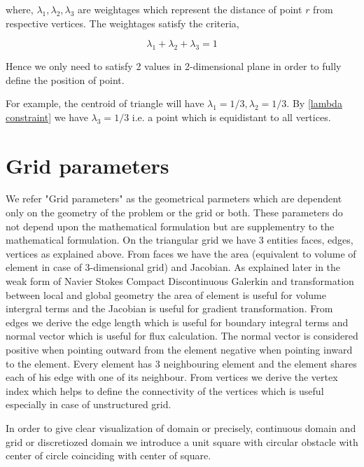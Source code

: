 \documentclass[a4paper,10pt]{book}
\begin{document}
where, $\lambda_1, \lambda_2, \lambda_3$ are weightages which represent the distance of point $r$ from respective vertices. The weightages satisfy the criteria,

\begin{equation}\label{lambda constraint}
\lambda_1 + \lambda_2 + \lambda_3 = 1
\end{equation}

Hence we only need to satisfy 2 values in 2-dimensional plane in order to fully define the position of point.

For example, the centroid of triangle will have $\lambda_1 = 1/3, \lambda_2 = 1/3$. By \eqref{lambda constraint} we have $\lambda_3=1/3$ i.e. a point which is equidistant to all vertices.

\section{Grid parameters}

We refer "Grid parameters" as the geometrical parmeters which are dependent only on the geometry of the problem or the grid or both. These parameters do not depend upon the mathematical formulation but are supplementry to the mathematical formulation. On the triangular grid we have 3 entities faces, edges, vertices as explained above. From faces we have the area (equivalent to volume of element in case of 3-dimensional grid) and Jacobian. As explained later in the weak form of Navier Stokes Compact Discontinuous Galerkin and transformation between local and global geometry the area of element is useful for volume intergral terms and the Jacobian is useful for gradient transformation. From edges we derive the edge length which is useful for boundary integral terms and normal vector which is useful for flux calculation. The normal vector is considered positive when pointing outward from the element negative when pointing inward to the element. Every element has 3 neighbouring element and the element shares each of his edge with one of its neighbour. From vertices we derive the vertex index which helps to define the connectivity of the vertices which is useful especially in case of unstructured grid. 

In order to give clear visualization of domain or precisely, continuous domain and grid or discretiozed domain we introduce a unit square with circular obstacle with center of circle coinciding with center of square. 

\newpage
\end{document}
